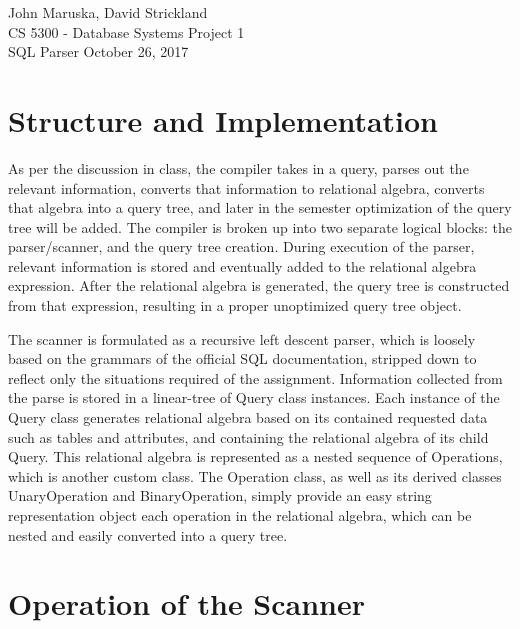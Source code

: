 \documentclass[]{article}
\begin{document}
	\noindent John Maruska, David Strickland \\
	CS 5300 - Database Systems \hfill Project 1 \\
	SQL Parser \hfill October 26, 2017
	
	\noindent\hrulefill 
	\doublespacing

	\section{Structure and Implementation}
	
	As per the discussion in class, the compiler takes in a query, parses out the relevant information, converts that information to relational algebra, converts that algebra into a query tree, and later in the semester optimization of the query tree will be added. The compiler is broken up into two separate logical blocks: the parser/scanner, and the query tree creation. During execution of the parser, relevant information is stored and eventually added to the relational algebra expression. After the relational algebra is generated, the query tree is constructed from that expression, resulting in a proper unoptimized query tree object.
	
	The scanner is formulated as a recursive left descent parser, which is loosely based on the grammars of the official SQL documentation, stripped down to reflect only the situations required of the assignment. Information collected from the parse is stored in a linear-tree of Query class instances. Each instance of the Query class generates relational algebra based on its contained requested data such as tables and attributes, and containing the relational algebra of its child Query. This relational algebra is represented as a nested sequence of Operations, which is another custom class. The Operation class, as well as its derived classes UnaryOperation and BinaryOperation, simply provide an easy string representation object each operation in the relational algebra, which can be nested and easily converted into a query tree. 

	
	\section{Operation of the Scanner}
	
\end{document}
